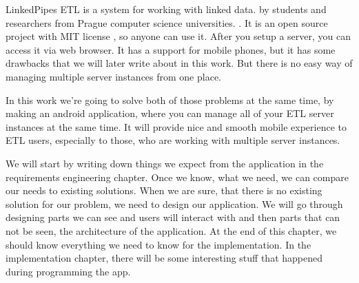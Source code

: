 LinkedPipes ETL is a system for working with linked data.
 by students and researchers from Prague computer science universities.
.
It is an open source project with MIT license , so anyone can use it.
After you setup a server, 
you can access it via web browser.
It has a support for mobile phones, but it has some drawbacks that we will later write about in this work.
But there is no easy way of managing multiple server instances from one place.

In this work we're going to  solve both of those problems at the same time, by making an android application, where you can manage all of your ETL server instances at the same time.
It will provide nice and smooth mobile experience to ETL users, especially to those, who are working with multiple server instances.

We will start by writing down things we expect from the application in the requirements engineering chapter.
Once we know, what we need, we can compare our needs to existing solutions.
When we are sure, that there is no existing solution for our problem, we need to design our application.
We will go through designing parts we can see and users will interact with and then parts that can not be seen, the architecture of the application.
At the end of this chapter, we should know everything we need to know for the implementation.
In the implementation chapter, there will be some interesting stuff that happened during programming the app.
